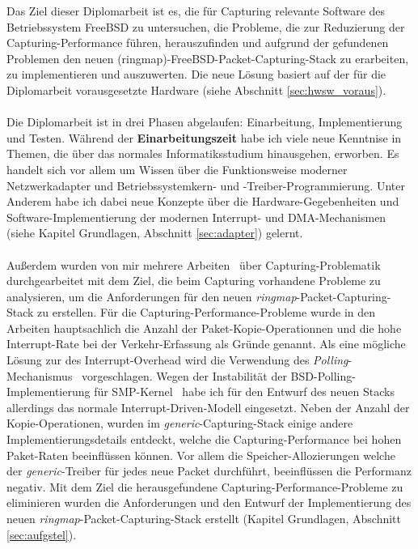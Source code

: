 Das Ziel dieser Diplomarbeit ist es, die für Capturing relevante Software des
Betriebssystem FreeBSD zu untersuchen, die Probleme, die zur Reduzierung der
Capturing-Performance führen, herauszufinden und aufgrund der gefundenen
Problemen den neuen (ringmap)-FreeBSD-Packet-Capturing-Stack zu erarbeiten,
zu implementieren und auszuwerten. Die neue Lösung basiert auf der für die Diplomarbeit
vorausgesetzte Hardware (siehe Abschnitt \ref{sec:hwsw_voraus}).\\\\
%
Die Diplomarbeit ist in drei Phasen abgelaufen: Einarbeitung, Implementierung
und Testen.  Während der \textbf{Einarbeitungszeit} habe ich viele neue
Kenntnise in Themen, die über das normales Informatiksstudium hinausgehen,
erworben.  Es handelt sich vor allem um Wissen über die Funktionsweise moderner
Netzwerkadapter und Betriebssystemkern- und -Treiber-Programmierung. Unter
Anderem habe ich dabei neue Konzepte über die Hardware-Gegebenheiten und
Software-Implementierung der modernen Interrupt- und DMA-Mechanismen (siehe
Kapitel Grundlagen, Abschnitt \ref{sec:adapter}) gelernt. \\\\
%
Außerdem wurden von mir mehrere Arbeiten~\cite{fabian_da, pcin10gb_paper,
perfev_paper, bpf_paper} über Capturing-Problematik durchgearbeitet mit dem
Ziel, die beim Capturing vorhandene Probleme zu analysieren, um die
Anforderungen für den neuen \emph{ringmap}-Packet-Capturing-Stack zu erstellen.
Für die Capturing-Performance-Probleme wurde in den Arbeiten hauptsachlich die
Anzahl der Paket-Kopie-Operationnen und die hohe Interrupt-Rate bei der
Verkehr-Erfassung als Gründe genannt. Als eine mögliche Lösung zur des
Interrupt-Overhead wird die Verwendung des
\emph{Polling}-Mechanismus~\cite{bsd_polling} vorgeschlagen.  Wegen der
Instabilität der BSD-Polling-Implementierung für
SMP-Kernel~\cite{bsd_devpoll_page} habe ich für den Entwurf des neuen Stacks
allerdings das normale Interrupt-Driven-Modell eingesetzt. Neben der Anzahl der
Kopie-Operationen, wurden im \emph{generic}-Capturing-Stack einige andere
Implementierungsdetails entdeckt, welche die Capturing-Performance bei hohen
Paket-Raten beeinflüssen können. Vor allem die Speicher-Allozierungen welche
der \emph{generic}-Treiber für jedes neue Packet durchführt, beeinflüssen die
Performanz negativ. Mit dem Ziel die herausgefundene
Capturing-Performance-Probleme zu eliminieren wurden die Anforderungen und den
Entwurf der Implementierung des neuen \emph{ringmap}-Packet-Capturing-Stack
erstellt (Kapitel Grundlagen, Abschnitt \ref{sec:aufgstel}).\\\\

